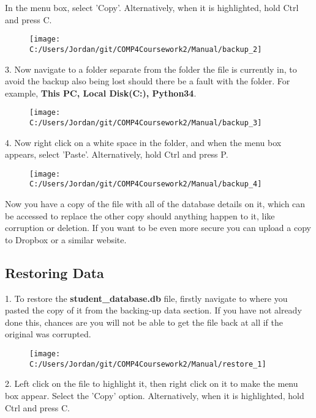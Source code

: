 In the menu box, select 'Copy'. Alternatively, when it is highlighted, hold Ctrl and press C.

\begin{figure}[H]
    \texttt{[image: C:/Users/Jordan/git/COMP4Coursework2/Manual/backup\_2]}
\end{figure}

3. Now navigate to a folder separate from the folder the file is currently in, to avoid the backup also being lost should there be a fault with the folder. For example, \textbf{This PC, Local Disk(C:), Python34}.

\begin{figure}[H]
    \texttt{[image: C:/Users/Jordan/git/COMP4Coursework2/Manual/backup\_3]}
\end{figure}

4. Now right click on a white space in the folder, and when the menu box appears, select 'Paste'.  Alternatively, hold Ctrl and press P.

\begin{figure}[H]
    \texttt{[image: C:/Users/Jordan/git/COMP4Coursework2/Manual/backup\_4]}
\end{figure}

Now you have a copy of the file with all of the database details on it, which can be accessed to replace the other copy should anything happen to it, like corruption or deletion. If you want to be even more secure you can upload a copy to Dropbox or a similar website.

\subsection{Restoring Data}

1. To restore the \textbf{student\_database.db} file, firstly navigate to where you pasted the copy of it from the backing-up data section. If you have not already done this, chances are you will not be able to get the file back at all if the original was corrupted.

\begin{figure}[H]
    \texttt{[image: C:/Users/Jordan/git/COMP4Coursework2/Manual/restore\_1]}
\end{figure}

2. Left click on the file to highlight it, then right click on it to make the menu box appear. Select the 'Copy' option. Alternatively, when it is highlighted, hold Ctrl and press C.

